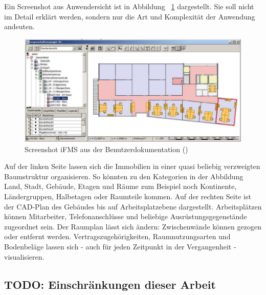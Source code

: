 Ein Screenshot aus Anwendersicht ist in Abbildung 
~\ref{fig:ifms_liegenschaftsbaum} dargestellt. Sie soll nicht im Detail erklärt 
werden, sondern nur die Art und Komplexität der Anwendung andeuten.
\begin{figure}[!h]
\begin{center}
\includegraphics[width=\textwidth]{images/iFMS_liegenschaftsbaum.png}
\caption{Screenshot iFMS aus der 
Benutzerdokumentation (\protect{}) }
\label{fig:ifms_liegenschaftsbaum}
\end{center}
\end{figure}
Auf der linken Seite lassen sich die Immobilien in einer quasi beliebig 
verzweigten Baumstruktur organisieren. So könnten zu den Kategorien in der 
Abbildung Land, Stadt, Gebäude, Etagen und Räume zum Beispiel noch Kontinente, 
Ländergruppen, Halbetagen oder Raumteile kommen.
Auf der rechten Seite ist der CAD-Plan des Gebäudes bis auf Arbeitsplatzebene 
dargestellt. Arbeitsplätzen können Mitarbeiter, Telefonanschlüsse und beliebige 
Ausrüstungsgegenstände zugeordnet sein. Der Raumplan lässt sich ändern: 
Zwischenwände können gezogen oder entfernt werden. Vertragszugehörigkeiten, 
Raumnutzungsarten und Bodenbeläge lassen sich - auch für jeden Zeitpunkt in der 
Vergangenheit - visualisieren.

\subsection{TODO: Einschränkungen dieser Arbeit}


